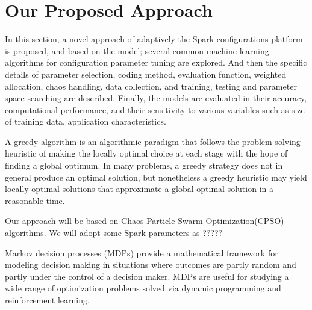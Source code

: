 \section{Our Proposed Approach}
\par In this section, a novel approach of adaptively the Spark configurations platform is proposed, and based on the model; several common machine learning algorithms for configuration parameter tuning are explored. And then the specific details of parameter selection, coding method, evaluation function, weighted allocation, chaos handling, data collection, and training, testing and parameter space searching are described. Finally, the models are evaluated in their accuracy, computational performance, and their sensitivity to various variables such as size of training data, application characteristics.

\par A greedy algorithm is an algorithmic paradigm that follows the problem solving heuristic of making the locally optimal choice at each stage\cite{greedy} with the hope of finding a global optimum. In many problems, a greedy strategy does not in general produce an optimal solution, but nonetheless a greedy heuristic may yield locally optimal solutions that approximate a global optimal solution in a reasonable time.
\par Our approach will be based on Chaos Particle Swarm Optimization(CPSO) algorithms. We will adopt some Spark parameters as ?????
\par Markov decision processes (MDPs) provide a mathematical framework for modeling decision making in situations where outcomes are partly random and partly under the control of a decision maker. MDPs are useful for studying a wide range of optimization problems solved via dynamic programming and reinforcement learning.


